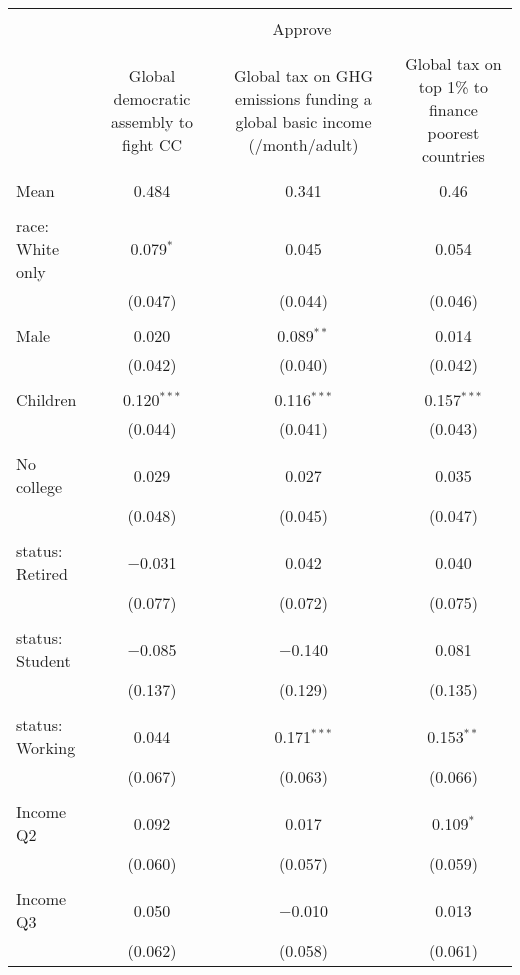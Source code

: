 
\begin{tabular}{@{\extracolsep{5pt}}lccc} 
\\[-1.8ex]\hline 
\hline \\[-1.8ex] 
 & \multicolumn{3}{c}{Approve} \\ 
\cline{2-4} 
\\[-1.8ex] & Global democratic assembly to fight CC & Global tax on GHG emissions funding a global basic income (\textdollar 30/month/adult) & Global tax on top 1\% to finance poorest countries \\ 
\hline \\[-1.8ex] 
 Mean & 0.484 & 0.341 & 0.46  \\ \hline \\[-1.8ex] race: White only & 0.079$^{*}$ & 0.045 & 0.054 \\ 
  & (0.047) & (0.044) & (0.046) \\ 
  & & & \\ 
 Male & 0.020 & 0.089$^{**}$ & 0.014 \\ 
  & (0.042) & (0.040) & (0.042) \\ 
  & & & \\ 
 Children & 0.120$^{***}$ & 0.116$^{***}$ & 0.157$^{***}$ \\ 
  & (0.044) & (0.041) & (0.043) \\ 
  & & & \\ 
 No college & 0.029 & 0.027 & 0.035 \\ 
  & (0.048) & (0.045) & (0.047) \\ 
  & & & \\ 
 status: Retired & $-$0.031 & 0.042 & 0.040 \\ 
  & (0.077) & (0.072) & (0.075) \\ 
  & & & \\ 
 status: Student & $-$0.085 & $-$0.140 & 0.081 \\ 
  & (0.137) & (0.129) & (0.135) \\ 
  & & & \\ 
 status: Working & 0.044 & 0.171$^{***}$ & 0.153$^{**}$ \\ 
  & (0.067) & (0.063) & (0.066) \\ 
  & & & \\ 
 Income Q2 & 0.092 & 0.017 & 0.109$^{*}$ \\ 
  & (0.060) & (0.057) & (0.059) \\ 
  & & & \\ 
 Income Q3 & 0.050 & $-$0.010 & 0.013 \\ 
  & (0.062) & (0.058) & (0.061) \\ 

\end{tabular}

